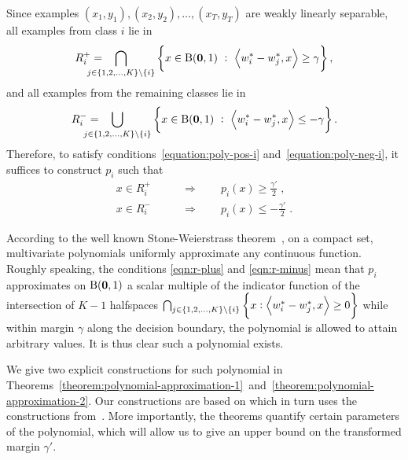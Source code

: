 Since examples $(x_1,y_1), (x_2, y_2), \dots, (x_T,y_T)$ are weakly linearly separable,
all examples from class $i$ lie in
$$
R_i^+ = \!\!\!\!\! \!\!\!\!\! \bigcap_{j \in \cbr{1,2,\dots,K} \setminus \cbr{i}} \cbr{x \in \B(\zero,1) ~:~ \ip{w_i^* - w_j^*}{x} \ge \gamma},
$$
and all examples from the remaining classes lie in
$$
R_i^- = \!\!\!\!\! \!\!\!\!\! \bigcup_{j \in \cbr{1,2,\dots,K} \setminus \cbr{i}} \cbr{x \in \B(\zero,1) ~:~ \ip{w_i^* - w_j^*}{x} \le -\gamma}.
$$
Therefore, to satisfy conditions~\eqref{equation:poly-pos-i}
and~\eqref{equation:poly-neg-i}, it suffices to construct $p_i$ such that
\begin{align}
\label{eqn:r-plus}
x \in R_i^+ \qquad & \Longrightarrow \qquad p_i(x) \ge \frac {\gamma'} 2 \; , \\
\label{eqn:r-minus}
x \in R_i^- \qquad & \Longrightarrow \qquad p_i(x) \le - \frac {\gamma'} 2 \; .
\end{align}

According to the well known Stone-Weierstrass theorem~\citep[see
e.g.][Section~10.10]{Davidson-Donsig-2010}, on a compact set, multivariate
polynomials uniformly approximate any continuous function. Roughly speaking, the
conditions \eqref{eqn:r-plus} and \eqref{eqn:r-minus} mean that $p_i$
approximates on $\operatorname{B}(\mathbf{0},1)$ a scalar multiple of the indicator function of the
intersection of $K-1$ halfspaces $\bigcap_{j \in \cbr{1,2,\dots,K} \setminus
\cbr{i}} \cbr{x: \ip{w_i^* - w_j^*}{x} \geq 0}$ while within margin $\gamma$ along
the decision boundary, the polynomial is allowed to attain arbitrary values.
It is thus clear such a polynomial exists.

We give two explicit constructions for such polynomial in
Theorems~\ref{theorem:polynomial-approximation-1}~and~\ref{theorem:polynomial-approximation-2}.
Our constructions are based on \citet{Klivans-Servedio-2008} which in turn uses
the constructions from~\citet{Beigel-Reingold-Spielman-1995}. More importantly,
the theorems quantify certain parameters of the polynomial, which will allow us
to give an upper bound on the transformed margin $\gamma'$.

